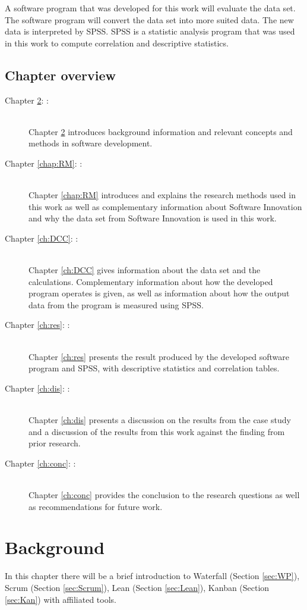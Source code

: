 \documentclass[UKenglish]{ifimaster}  %
\begin{document}
A software program that was developed for this work will evaluate the data set. The software program will convert the data set into more suited data. The new data is interpreted by SPSS. SPSS is a statistic analysis program that was used in this work to compute correlation and descriptive statistics.

\section{Chapter overview}
\begin{description}
\item[Chapter \ref{chap:Background}: :] \hfill \\  
Chapter \ref{chap:Background} introduces background information and relevant concepts and methods in software development.
\item[Chapter \ref{chap:RM}: :] \hfill \\  
Chapter \ref{chap:RM} introduces and explains the research methods used in this work as well as complementary information about Software Innovation and why the data set from Software Innovation is used in this work.  
\item[Chapter \ref{ch:DCC}: :] \hfill \\
Chapter \ref{ch:DCC} gives information about the data set and the calculations. Complementary information about how the developed program operates is given, as well as information about how the output data from the program is measured using SPSS.

\item[Chapter \ref{ch:res}: :] \hfill \\
Chapter \ref{ch:res} presents the result produced by the developed software program and SPSS, with descriptive statistics and correlation tables. 
\item[Chapter \ref{ch:dis}: :] \hfill \\
Chapter \ref{ch:dis} presents a discussion on the results from the case study and a discussion of the results from this work against the finding from prior research. 
\item[Chapter \ref{ch:conc}: :] \hfill \\
Chapter \ref{ch:conc} provides the conclusion to the research questions as well as recommendations for future work.
\end{description}


\chapter{Background}  
\label{chap:Background}                %
In this chapter there will be a brief introduction to Waterfall (Section \ref{sec:WP}), Scrum (Section \ref{sec:Scrum}), Lean (Section \ref{sec:Lean}), Kanban (Section \ref{sec:Kan}) with affiliated tools.
\end{document}

